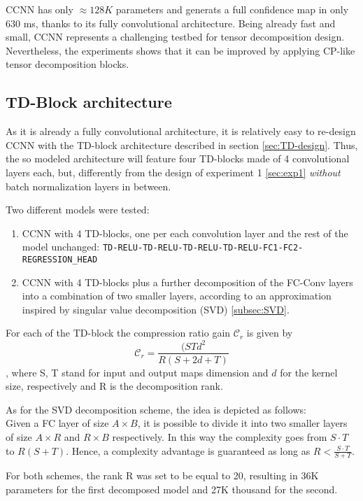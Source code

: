 CCNN has only $\approx 128K$ parameters and generats a full confidence map in only 630 ms, thanks to its fully convolutional architecture. Being already fast and small,  CCNN represents a challenging testbed for tensor decomposition design. Nevertheless, the experiments shows that it can be improved by applying CP-like tensor decomposition blocks.  

\subsection{TD-Block architecture}
As it is already a fully convolutional architecture, it is relatively easy to re-design CCNN with the TD-block architecture described in section \ref{sec:TD-design}. Thus, the so modeled architecture will feature four TD-blocks made of 4 convolutional layers each, but, differently from the design of experiment 1 \ref{sec:exp1} \emph{without} batch normalization layers in between. 
\newline 

Two different models were tested:  
\begin{enumerate}
    \item CCNN with 4 TD-blocks, one per each convolution layer and the rest of the model unchanged: \texttt{TD-RELU-TD-RELU-TD-RELU-TD-RELU-FC1-FC2-REGRESSION_HEAD}
    
    \item CCNN with 4 TD-blocks plus a further decomposition of the FC-Conv layers into a combination of two smaller layers, according to an approximation inspired by singular value decomposition (SVD) \ref{subsec:SVD}.
    
\end{enumerate}

For each of the TD-block the compression ratio gain $\mathcal{C}_r$ is given by $$\mathcal{C}_r = \frac{(STd^2}{R(S+2d+T)}$$, 
where S, T stand for input and output maps dimension and $d$ for the kernel size, respectively and R is the decomposition rank. 

As for the SVD decomposition scheme, the idea is depicted as follows: 
\\
Given a FC layer of size $A \times B$, it is possible to divide it into two smaller layers of size $A \times R$ and $R \times B$ respectively. In this way the complexity goes from $S\cdot T$ to $R(S+T)$. Hence, a complexity advantage is guaranteed as long as $R < \frac{S\cdot T}{S+T} $. 

For both schemes, the rank R was set to be equal to 20, resulting in 36K parameters for the first decomposed model and 27K thousand for the second. 

